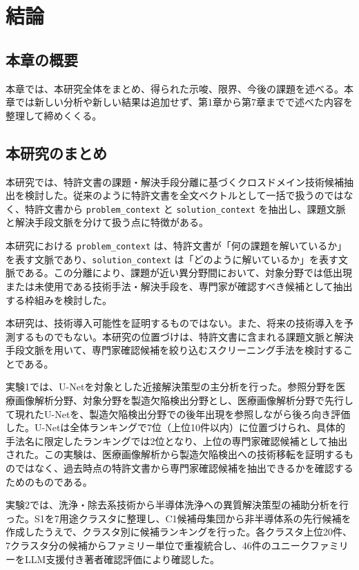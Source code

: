 \chapter{結論}

\section{本章の概要}

本章では、本研究全体をまとめ、得られた示唆、限界、今後の課題を述べる。本章では新しい分析や新しい結果は追加せず、第1章から第7章までで述べた内容を整理して締めくくる。

\section{本研究のまとめ}

本研究では、特許文書の課題・解決手段分離に基づくクロスドメイン技術候補抽出を検討した。従来のように特許文書を全文ベクトルとして一括で扱うのではなく、特許文書から \texttt{problem\_context} と \texttt{solution\_context} を抽出し、課題文脈と解決手段文脈を分けて扱う点に特徴がある。

本研究における \texttt{problem\_context} は、特許文書が「何の課題を解いているか」を表す文脈であり、\texttt{solution\_context} は「どのように解いているか」を表す文脈である。この分離により、課題が近い異分野間において、対象分野では低出現または未使用である技術手法・解決手段を、専門家が確認すべき候補として抽出する枠組みを検討した。

本研究は、技術導入可能性を証明するものではない。また、将来の技術導入を予測するものでもない。本研究の位置づけは、特許文書に含まれる課題文脈と解決手段文脈を用いて、専門家確認候補を絞り込むスクリーニング手法を検討することである。

実験1では、U-Netを対象とした近接解決策型の主分析を行った。参照分野を医療画像解析分野、対象分野を製造欠陥検出分野とし、医療画像解析分野で先行して現れたU-Netを、製造欠陥検出分野での後年出現を参照しながら後ろ向き評価した。U-Netは全体ランキングで7位（上位10件以内）に位置づけられ、具体的手法名に限定したランキングでは2位となり、上位の専門家確認候補として抽出された。この実験は、医療画像解析から製造欠陥検出への技術移転を証明するものではなく、過去時点の特許文書から専門家確認候補を抽出できるかを確認するためのものである。

実験2では、洗浄・除去系技術から半導体洗浄への異質解決策型の補助分析を行った。S1を7用途クラスタに整理し、C1候補母集団から非半導体系の先行候補を作成したうえで、クラスタ別に候補ランキングを行った。各クラスタ上位20件、7クラスタ分の候補からファミリー単位で重複統合し、46件のユニークファミリーをLLM支援付き著者確認評価により確認した。

